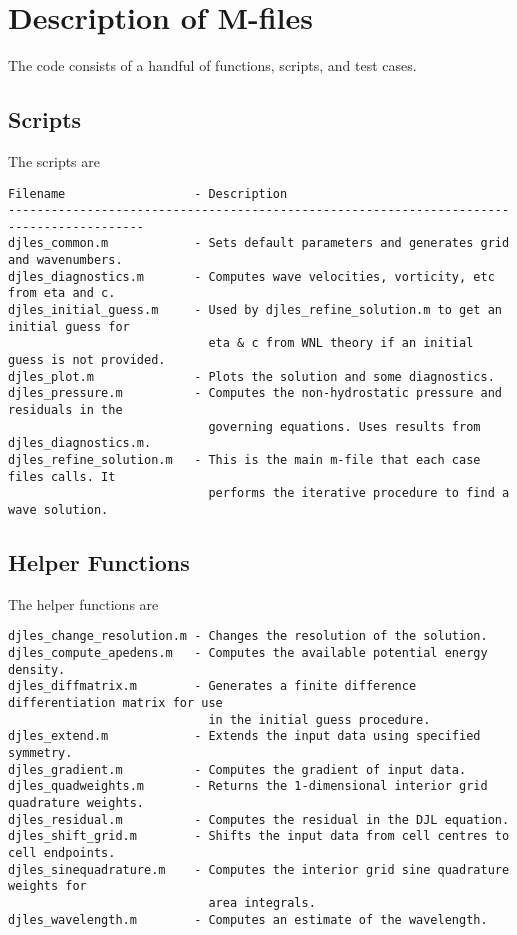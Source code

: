 \documentclass[letterpaper]{article}
\begin{document}
\section{Description of M-files}
The code consists of a handful of functions, scripts, and test cases.

\subsection{Scripts}
The scripts are
\begin{verbatim}
Filename                  - Description
-----------------------------------------------------------------------------------------
djles_common.m            - Sets default parameters and generates grid and wavenumbers.
djles_diagnostics.m       - Computes wave velocities, vorticity, etc from eta and c.
djles_initial_guess.m     - Used by djles_refine_solution.m to get an initial guess for
                            eta & c from WNL theory if an initial guess is not provided.
djles_plot.m              - Plots the solution and some diagnostics.
djles_pressure.m          - Computes the non-hydrostatic pressure and residuals in the
                            governing equations. Uses results from djles_diagnostics.m.
djles_refine_solution.m   - This is the main m-file that each case files calls. It
                            performs the iterative procedure to find a wave solution.
\end{verbatim}

\subsection{Helper Functions}
The helper functions are
\begin{verbatim}
djles_change_resolution.m - Changes the resolution of the solution.
djles_compute_apedens.m   - Computes the available potential energy density.
djles_diffmatrix.m        - Generates a finite difference differentiation matrix for use
                            in the initial guess procedure.
djles_extend.m            - Extends the input data using specified symmetry.
djles_gradient.m          - Computes the gradient of input data.
djles_quadweights.m       - Returns the 1-dimensional interior grid quadrature weights.
djles_residual.m          - Computes the residual in the DJL equation.
djles_shift_grid.m        - Shifts the input data from cell centres to cell endpoints.
djles_sinequadrature.m    - Computes the interior grid sine quadrature weights for
                            area integrals.
djles_wavelength.m        - Computes an estimate of the wavelength.
\end{verbatim}
\end{document}
